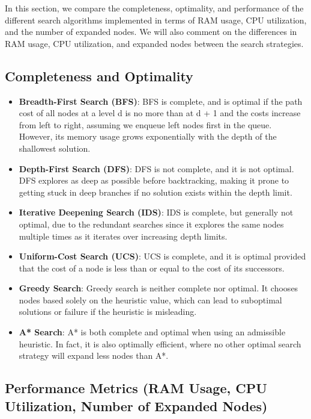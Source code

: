 \documentclass{article}
\begin{document}
In this section, we compare the completeness, optimality, and performance of the different search algorithms implemented in terms of RAM usage, CPU utilization, and the number of expanded nodes. We will also comment on the differences in RAM usage, CPU utilization, and expanded nodes between the search strategies.

\subsection{Completeness and Optimality}
\begin{itemize}
    \item \textbf{Breadth-First Search (BFS)}: BFS is complete, and is optimal if the path cost of all nodes at a level d is no more than at d + 1 and the costs increase from left to right, assuming we enqueue left nodes first in the queue. However, its memory usage grows exponentially with the depth of the shallowest solution.

    \item \textbf{Depth-First Search (DFS)}: DFS is not complete, and it is not optimal. DFS explores as deep as possible before backtracking, making it prone to getting stuck in deep branches if no solution exists within the depth limit.

    \item \textbf{Iterative Deepening Search (IDS)}: IDS is complete, but generally not optimal, due to the redundant searches since it explores the same nodes multiple times as it iterates over increasing depth limits.

    \item \textbf{Uniform-Cost Search (UCS)}: UCS is complete, and it is optimal provided that the cost of a node is less than or equal to the cost of its successors.

    \item \textbf{Greedy Search}: Greedy search is neither complete nor optimal. It chooses nodes based solely on the heuristic value, which can lead to suboptimal solutions or failure if the heuristic is misleading.

    \item \textbf{A* Search}: A* is both complete and optimal when using an admissible heuristic. In fact, it is also optimally efficient, where no other optimal search strategy will expand less nodes than A*.
\end{itemize}

\subsection{Performance Metrics (RAM Usage, CPU Utilization, Number of Expanded Nodes)}
\end{document}
